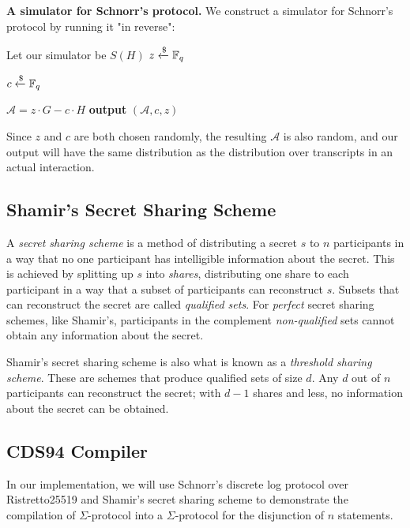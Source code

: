\textbf{A simulator for Schnorr's protocol.} We construct a simulator for Schnorr's protocol by running it "in reverse":

\begin{center}
    \begin{problem}[]{Let our simulator be $S(H)$}
    $z \xleftarrow{\$} \mathbb{F}_q$ 
    
    $c \xleftarrow{\$} \mathbb{F}_q$
    
    $\mathcal A = z \cdot G - c \cdot H$
    \tcblower
    \textbf{output} $(\mathcal A,c,z)$
    \end{problem}
\end{center}

Since $z$ and $c$ are both chosen randomly, the resulting $\mathcal A$ is also random, and our output will have the same distribution as the distribution over transcripts in an actual interaction.

\subsection{Shamir's Secret Sharing Scheme}
A \textit{secret sharing scheme} is a method of distributing a secret $s$ to $n$ participants in a way that no one participant has intelligible information about the secret. This is achieved by splitting up $s$ into \textit{shares}, distributing one share to each participant in a way that a subset of participants can reconstruct $s$. Subsets that can reconstruct the secret are called \textit{qualified sets}. For \textit{perfect} secret sharing schemes, like Shamir's, participants in the complement \textit{non-qualified} sets cannot obtain any information about the secret.

Shamir's secret sharing scheme \cite{DBLP:journals/cacm/Shamir79} is also what is known as a \textit{threshold sharing scheme}. These are schemes that produce  qualified sets of size $d$. Any $d$ out of $n$ participants can reconstruct the secret; with $d-1$ shares and less, no  information about the secret can be obtained. 

\subsection{CDS94 Compiler}


In our implementation, we will use Schnorr's discrete log protocol over Ristretto25519 and Shamir's secret sharing scheme to demonstrate the compilation of $\Sigma$-protocol into a $\Sigma$-protocol for the disjunction of $n$ statements. 

